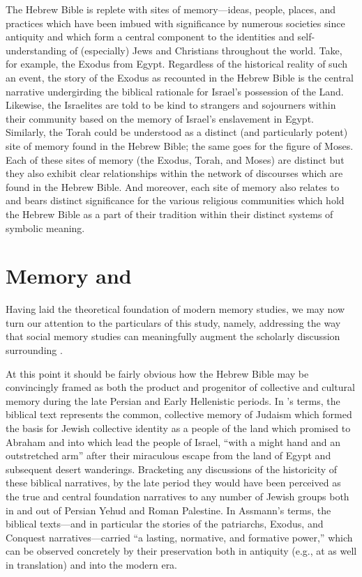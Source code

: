 The Hebrew Bible is replete with sites of memory---ideas, people, places, and practices which have been imbued with significance by numerous societies since antiquity and which form a central component to the identities and self-understanding of (especially) Jews and Christians throughout the world. Take, for example, the Exodus from Egypt. Regardless of the historical reality of such an event, the story of the Exodus as recounted in the Hebrew Bible is the central narrative undergirding the biblical rationale for Israel's possession of the Land. Likewise, the Israelites are told to be kind to strangers and sojourners within their community based on the memory of Israel's enslavement in Egypt. Similarly, the Torah could be understood as a distinct (and particularly potent) site of memory found in the Hebrew Bible; the same goes for the figure of Moses. Each of these sites of memory (the Exodus, Torah, and Moses) are distinct but they also exhibit clear relationships within the network of discourses which are found in the Hebrew Bible. And moreover, each site of memory also relates to and bears distinct significance for the various religious communities which hold the Hebrew Bible as a part of their tradition within their distinct systems of symbolic meaning. 

\section{Memory and \RwB}

Having laid the theoretical foundation of modern memory studies, we may now turn our attention to the particulars of this study, namely, addressing the way that social memory studies can meaningfully augment the scholarly discussion surrounding \rwb.\autocite[See also][]{brooke_zsengeller2014}  

At this point it should be fairly obvious how the Hebrew Bible may be convincingly framed as both the product and progenitor of collective and cultural memory during the late Persian and Early Hellenistic periods. In \halbwachs's terms, the biblical text represents the common, collective memory of \secondtemple Judaism which formed the basis for Jewish collective identity as a people of the land which \yahweh promised to Abraham and into which \yahweh lead the people of Israel, ``with a might hand and an outstretched arm'' after their miraculous escape from the land of Egypt and subsequent desert wanderings. Bracketing any discussions of the historicity of these biblical narratives, by the late \secondtemple period they would have been perceived as the true and central foundation narratives to any number of Jewish groups both in and out of Persian Yehud and Roman Palestine. In Assmann's terms, the biblical texts---and in particular the stories of the patriarchs, Exodus, and Conquest narratives---carried ``a lasting, normative, and formative power,''\autocite[38]{assmann2011} which can be observed concretely by their preservation both in antiquity (e.g., at \qumran as well in translation) and into the modern era.  

